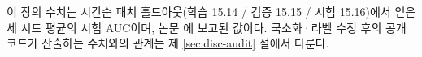
이 장의 수치는 시간순 패치 홀드아웃(학습 15.14 / 검증 15.15 / 시험 15.16)에서 얻은 세 시드 평균의 시험 AUC이며, 논문 \cite{baek2026killconditioned}에 보고된 값이다. 국소화·라벨 수정 후의 공개 코드가 산출하는 수치와의 관계는 제 \ref{sec:disc-audit} 절에서 다룬다. 

